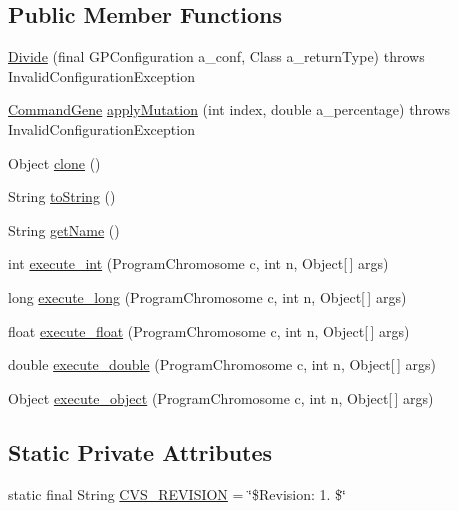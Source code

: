 \subsection*{Public Member Functions}
\begin{DoxyCompactItemize}
\item 
\hyperlink{classorg_1_1jgap_1_1gp_1_1function_1_1_divide_ab5fda16ab989fad4f7cc62dcedbd45f9}{Divide} (final G\-P\-Configuration a\-\_\-conf, Class a\-\_\-return\-Type)  throws Invalid\-Configuration\-Exception 
\item 
\hyperlink{classorg_1_1jgap_1_1gp_1_1_command_gene}{Command\-Gene} \hyperlink{classorg_1_1jgap_1_1gp_1_1function_1_1_divide_a94363ce64fcba06e32202e3e547c8e02}{apply\-Mutation} (int index, double a\-\_\-percentage)  throws Invalid\-Configuration\-Exception 
\item 
Object \hyperlink{classorg_1_1jgap_1_1gp_1_1function_1_1_divide_aa1785a3ea0b92f3b0cb283397dc92466}{clone} ()
\item 
String \hyperlink{classorg_1_1jgap_1_1gp_1_1function_1_1_divide_a0dbc6be6682eb1e4389918e921498a84}{to\-String} ()
\item 
String \hyperlink{classorg_1_1jgap_1_1gp_1_1function_1_1_divide_aff263ec49f5b5ed3feb587423b15035d}{get\-Name} ()
\item 
int \hyperlink{classorg_1_1jgap_1_1gp_1_1function_1_1_divide_aa0260ee81c553456604a56a3b6707f85}{execute\-\_\-int} (Program\-Chromosome c, int n, Object\mbox{[}$\,$\mbox{]} args)
\item 
long \hyperlink{classorg_1_1jgap_1_1gp_1_1function_1_1_divide_a651531f0f62d9dc76de3077fb99f4c2a}{execute\-\_\-long} (Program\-Chromosome c, int n, Object\mbox{[}$\,$\mbox{]} args)
\item 
float \hyperlink{classorg_1_1jgap_1_1gp_1_1function_1_1_divide_a752a0d08d0dc4487646a65959fdd8ed7}{execute\-\_\-float} (Program\-Chromosome c, int n, Object\mbox{[}$\,$\mbox{]} args)
\item 
double \hyperlink{classorg_1_1jgap_1_1gp_1_1function_1_1_divide_a363ff7891c6fbdb2c0884540535edcf7}{execute\-\_\-double} (Program\-Chromosome c, int n, Object\mbox{[}$\,$\mbox{]} args)
\item 
Object \hyperlink{classorg_1_1jgap_1_1gp_1_1function_1_1_divide_af9e224af4eb2d82978a17f9461c70b51}{execute\-\_\-object} (Program\-Chromosome c, int n, Object\mbox{[}$\,$\mbox{]} args)
\end{DoxyCompactItemize}
\subsection*{Static Private Attributes}
\begin{DoxyCompactItemize}
\item 
static final String \hyperlink{classorg_1_1jgap_1_1gp_1_1function_1_1_divide_ac7c0e068af15482e4d193157816625de}{C\-V\-S\-\_\-\-R\-E\-V\-I\-S\-I\-O\-N} = \char`\"{}\$Revision\-: 1. \$\char`\"{}
\end{DoxyCompactItemize}
